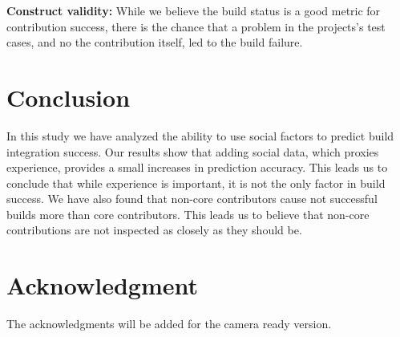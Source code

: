 \documentclass[10pt, conference]{IEEEtran}
\begin{document}
\noindent\textbf{Construct validity:}
While we believe the build status is a good metric for contribution success,
there is the chance that a problem in the projects's test cases, and no the
contribution itself, led to the build failure.

\section{Conclusion}
In this study we have analyzed the ability to use social factors to predict
build integration success.
Our results show that adding social data, which proxies experience, provides a
small increases in prediction accuracy.  This leads us to conclude that while
experience is important, it is not the only factor in build success.
We have also found that non-core contributors cause not successful builds more
than core contributors.  This leads us to believe that non-core contributions
are not inspected as closely as they should be.


\section*{Acknowledgment}

The acknowledgments will be added for the camera ready version.




%
%
%






\end{document}
